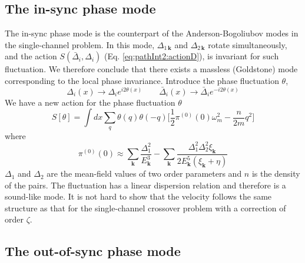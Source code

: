 \documentclass[reprint,pra]{revtex4-1}
\newcommand{\vk}{\ensuremath{\mathbf{k}}}
\newcommand{\nth}[1]{\ensuremath{\frac{1}{#1}}}
\begin{document}
\subsection{The in-sync phase mode}
The in-sync phase mode is the counterpart of the Anderson-Bogoliubov modes in the single-channel problem\cite{RanderiaBEC, Nagaosa}. %
In this mode,  $\Delta_{1\,\vk}$ and $\Delta_{2\,\vk}$ rotate simultaneously, and the action $S(\bar{\Delta}_i,\Delta_i)$ (Eq. \ref{eq:pathInt2:actionD}), is invariant for such fluctuation.  
 We therefore conclude that there exists a massless (Goldstone) mode corresponding to the local phase invariance.  Introduce the phase fluctuation $\theta$, 
\begin{equation*}
\Delta_{i}(x)\rightarrow{}\Delta_{i}e^{i2\theta(x)}\qquad{}
\bar{\Delta}_{i}(x)\rightarrow{}\bar{\Delta}_{i}e^{-i2\theta(x)}
\end{equation*}
We have a new action for the phase fluctuation $\theta$
\begin{equation}
S[\theta]=\int{dx}\sum_{q}\theta(q)\theta(-q)\big[\nth{2}\pi^{(0)}(0)\omega_m^2-\frac{n}{2m}q^2\big]
\end{equation}
where 
\begin{equation}
\pi^{(0)}(0)\approx\sum_{\vk}\frac{\Delta_{1}^{2}}{E_{\vk}^{3}}
	-\sum_{\vk}\frac{\Delta_{1}^{2}\Delta_{2}^{2}\xi_{\vk}}{2E_{\vk}^{5}(\xi_{\vk}+\eta)}
\label{eq:pathInt2:pi0}
\end{equation}
$\Delta_1$ and $\Delta_2$ are the mean-field values of two order parameters and $n$ is the density of the pairs. 
The fluctuation has a linear dispersion relation and therefore is a sound-like mode.    It is not hard to show that the velocity follows the same structure as that for the single-channel crossover problem  with a correction of order  $\zeta$.
\subsection{The out-of-sync phase mode}
\end{document}
